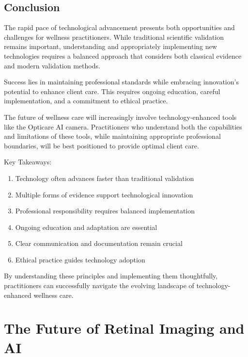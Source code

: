 \documentclass[
  Letterpaper,
]{scrbook}
\providecommand{\tightlist}{%
  \setlength{\itemsep}{0pt}\setlength{\parskip}{0pt}}\usepackage{longtable,booktabs,array}
\begin{document}
\section{Conclusion}\label{conclusion-2}

The rapid pace of technological advancement presents both opportunities
and challenges for wellness practitioners. While traditional scientific
validation remains important, understanding and appropriately
implementing new technologies requires a balanced approach that
considers both classical evidence and modern validation methods.

Success lies in maintaining professional standards while embracing
innovation's potential to enhance client care. This requires ongoing
education, careful implementation, and a commitment to ethical practice.

The future of wellness care will increasingly involve
technology-enhanced tools like the Opticare AI camera. Practitioners who
understand both the capabilities and limitations of these tools, while
maintaining appropriate professional boundaries, will be best positioned
to provide optimal client care.

Key Takeaways:

\begin{enumerate}
\def\labelenumi{\arabic{enumi}.}
\tightlist
\item
  Technology often advances faster than traditional validation
\item
  Multiple forms of evidence support technological innovation
\item
  Professional responsibility requires balanced implementation
\item
  Ongoing education and adaptation are essential
\item
  Clear communication and documentation remain crucial
\item
  Ethical practice guides technology adoption
\end{enumerate}

By understanding these principles and implementing them thoughtfully,
practitioners can successfully navigate the evolving landscape of
technology-enhanced wellness care.


\chapter{The Future of Retinal Imaging and
AI}\label{the-future-of-retinal-imaging-and-ai}
\end{document}
